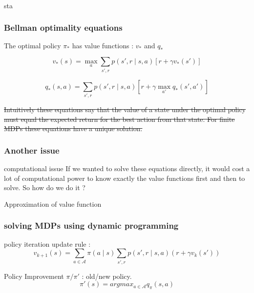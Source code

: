 sta\documentclass[dvipsnames,svgnames]{beamer}
\begin{document}
\begin{frame}
\frametitle{Bellman optimality equations}

The optimal policy $\pi_{*}$ has value functions : $v_*$ and $q_*$

\begin{block}{}

\begin{equation}
v_{*}(s)=\max_{a} \sum_{s',r}p(s',r\mid s,a)[r+\gamma v_{*}(s')]
\label{bellman_opt_v}
\end{equation}

\begin{equation}
q_{*}(s,a)= \sum_{s',r}p(s',r \mid s,a)[r+\gamma \max_{a'}q_{*}(s',a')]
\label{bellman_opt_q}
\end{equation}
\end{block}

\sout{Intuitively these equations say that the value of a state under the optimal policy must equal the expected return for the best action from that state. For finite MDPs these equations have a unique solution.}
\end{frame}

\begin{frame}
\frametitle{Another issue}
\begin{alertblock}{computational issue}
If we wanted to solve these equations directly, it would cost a lot of computational power to know exactly the value functions first and then to solve. So how do we do it ? 
\end{alertblock}

\pause 
\vspace{1cm}
\centering
Approximation of value function

\end{frame}

\begin{frame}
\frametitle{solving MDPs using dynamic programming}
\begin{block}{policy iteration}
update rule : 
$$ v_{k+1}(s)=\sum_{a \in \mathcal{A}}\pi(a \mid s)\sum_{s',r}p(s',r\mid s,a)(r+\gamma v_k(s')) $$
\end{block}
\pause
\begin{block}{Policy Improvement}
$\pi/\pi'$ : old/new policy.
$$\pi'(s) = argmax_{a \in \mathcal{A}}q_{\pi}(s,a) $$
\end{block}

\end{frame}
\end{document}
